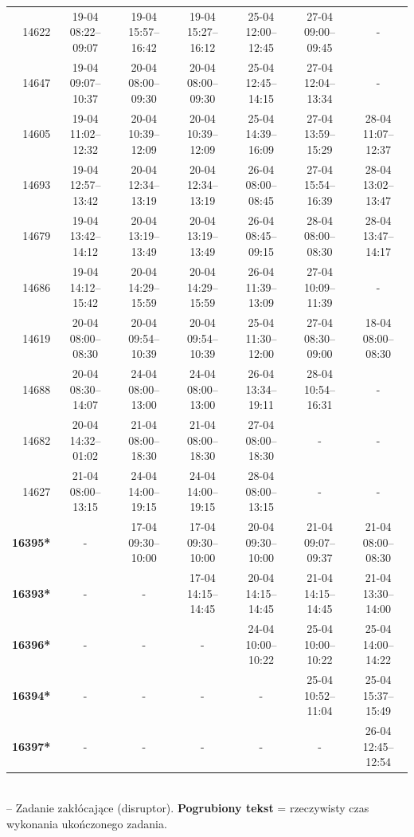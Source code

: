 \begin{table}[htbp]
\begin{tabular}{|r|c|c|c|c|c|c|}
14622 & 19-04 08:22--09:07 & 19-04 15:57--16:42 & 19-04 15:27--16:12 & 25-04 12:00--12:45 & 27-04 09:00--09:45 & - \\ 
14647 & 19-04 09:07--10:37 & 20-04 08:00--09:30 & 20-04 08:00--09:30 & 25-04 12:45--14:15 & 27-04 12:04--13:34 & - \\ 
14605 & 19-04 11:02--12:32 & 20-04 10:39--12:09 & 20-04 10:39--12:09 & 25-04 14:39--16:09 & 27-04 13:59--15:29 & 28-04 11:07--12:37 \\ 
14693 & 19-04 12:57--13:42 & 20-04 12:34--13:19 & 20-04 12:34--13:19 & 26-04 08:00--08:45 & 27-04 15:54--16:39 & 28-04 13:02--13:47 \\ 
14679 & 19-04 13:42--14:12 & 20-04 13:19--13:49 & 20-04 13:19--13:49 & 26-04 08:45--09:15 & 28-04 08:00--08:30 & 28-04 13:47--14:17 \\ 
14686 & 19-04 14:12--15:42 & 20-04 14:29--15:59 & 20-04 14:29--15:59 & 26-04 11:39--13:09 & 27-04 10:09--11:39 & - \\ 
14619 & 20-04 08:00--08:30 & 20-04 09:54--10:39 & 20-04 09:54--10:39 & 25-04 11:30--12:00 & 27-04 08:30--09:00 & 18-04 08:00--08:30 \\ 
14688 & 20-04 08:30--14:07 & 24-04 08:00--13:00 & 24-04 08:00--13:00 & 26-04 13:34--19:11 & 28-04 10:54--16:31 & - \\ 
14682 & 20-04 14:32--01:02 & 21-04 08:00--18:30 & 21-04 08:00--18:30 & 27-04 08:00--18:30 & - & - \\ 
14627 & 21-04 08:00--13:15 & 24-04 14:00--19:15 & 24-04 14:00--19:15 & 28-04 08:00--13:15 & - & - \\ 
\hline
\textbf{16395*} & - & 17-04 09:30--10:00 & 17-04 09:30--10:00 & 20-04 09:30--10:00 & 21-04 09:07--09:37 & 21-04 08:00--08:30 \\ 
\textbf{16393*} & - & - & 17-04 14:15--14:45 & 20-04 14:15--14:45 & 21-04 14:15--14:45 & 21-04 13:30--14:00 \\ 
\textbf{16396*} & - & - & - & 24-04 10:00--10:22 & 25-04 10:00--10:22 & 25-04 14:00--14:22 \\ 
\textbf{16394*} & - & - & - & - & 25-04 10:52--11:04 & 25-04 15:37--15:49 \\ 
\textbf{16397*} & - & - & - & - & - & 26-04 12:45--12:54 \\ 
\hline
\end{tabular}
\\ {\tiny * -- Zadanie zakłócające (disruptor). \textbf{Pogrubiony tekst} = rzeczywisty czas wykonania ukończonego zadania.}
\end{table}

